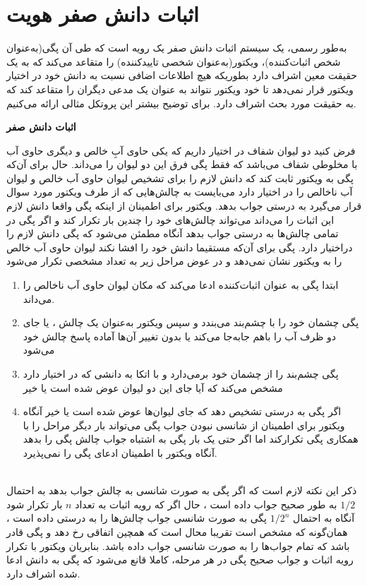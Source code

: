 
\section{اثبات دانش صفر هویت}\label{ZKPOI}

به‌طور رسمی، یک سیستم اثبات دانش صفر یک رویه است که طی آن پگی(به‌عنوان شخص اثبات‌کننده)، ویکتور(به‌عنوان شخصی تاییدکننده) را متقاعد می‌کند که به یک حقیقت معین  
اشراف دارد بطوریکه هیچ اطلاعات اضافی نسبت به دانش خود در اختیار ویکتور قرار نمی‌دهد تا خود ویکتور نتواند به عنوان یک مدعی دیگران را متقاعد کند که به حقیقت مورد بحث اشراف دارد. برای توضیح بیشتر این پروتکل مثالی ارائه می‌کنیم.
\begin{example}\label{ex_zkp}\textbf{اثبات دانش صفر}
	
فرض کنید دو لیوان شفاف در اختیار داریم که یکی حاوی آبِ خالص و دیگری حاوی آب با مخلوطی شفاف می‌باشد که فقط پگی فرق این دو لیوان را می‌داند. حال برای آن‌که پگی به ویکتور ثابت کند که دانش لازم را برای تشخیص لیوان حاوی آب خالص و لیوان آب ناخالص را در اختیار دارد می‌بایست به چالش‌هایی که از طرف ویکتور مورد سوال قرار می‌گیرد به درستی جواب بدهد. ویکتور برای اطمینان از اینکه پگی واقعا دانش لازم این اثبات را می‌داند می‌تواند چالش‌های خود را چندین بار تکرار کند و اگر پگی در تمامی چالش‌ها به درستی جواب بدهد آنگاه مطمئن می‌شود که پگی دانش لازم را دراختیار دارد. پگی برای آن‌که مستقیما دانش خود را افشا نکند لیوان حاوی آب خالص را به ویکتور نشان نمی‌دهد و در عوض مراحل زیر به تعداد مشخصی تکرار می‌شود
\begin{enumerate}
	\item 
	ابتدا پگی به عنوان اثبات‌کننده ادعا می‌کند که مکان لیوان‌ حاوی آب ناخالص  را می‌داند.
	\item 
 پگی چشمان خود را با چشم‌بند می‌بندد و سپس	ویکتور به‌عنوان یک  چالش ، یا جای دو ظرف آب را باهم جا‌به‌جا می‌کند یا بدون تغییر آن‌ها آماده پاسخ چالش خود می‌شود
	\item 
	پگی چشم‌بند را از چشمان خود برمی‌دارد و با اتکا به دانشی که در اختیار دارد مشخص می‌کند که آیا جای این دو لیوان عوض شده است یا خیر
	\item 
	اگر پگی به درستی تشخیص دهد که جای لیوان‌ها عوض شده است یا خیر  آنگاه ویکتور برای اطمینان از شانسی نبودن جواب پگی می‌تواند بار دیگر مراحل را با همکاری پگی تکرارکند اما اگر حتی یک بار پگی به اشتباه جواب چالش پگی را بدهد آنگاه ویکتور با اطمینان ادعای پگی را نمی‌پذیرد.
\end{enumerate}~
\\
ذکر این نکته لازم است که اگر پگی به صورت شانسی به چالش جواب بدهد به احتمال
$1/2$
به طور صحیح  جواب داده است ، حال اگر  که رویه اثبات به تعداد 
$n$
بار تکرار شود آنگاه به احتمال 
$1 / 2^n$
 پگی به صورت شانسی جواب چالش‌ها را  به درستی داده است ، همان‌گونه که مشخص است تقریبا محال است که همچین اتفاقی رخ دهد و پگی قادر باشد که تمام جواب‌ها را به صورت شانسی جواب داده باشد. بنابریان ویکتور با تکرار رویه اثبات و جواب صحیح پگی در هر مرحله، کاملا قانع می‌شود که پگی به دانش ادعا شده اشراف دارد.

\end{example}~
